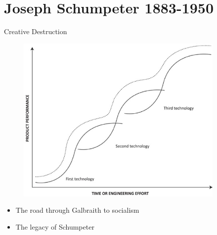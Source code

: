 \documentclass{beamer}
\begin{document}
\section{Joseph Schumpeter 1883-1950}

\begin{frame}{Creative Destruction}

\begin{figure}
    \centering
    \includegraphics[width=0.9\textwidth]{../img/CreativeDestruction.jpg}
\end{figure}{}

\end{frame}

\begin{frame}

	\begin{itemize}
		\item The road through Galbraith to socialism \pause
		\item The legacy of Schumpeter
	\end{itemize}

\end{frame}{}
\end{document}
